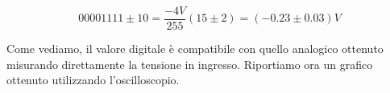 $$00001111\pm10=\frac{-4 V}{255}(15\pm2)=(-0.23\pm0.03)V$$

Come vediamo, il valore digitale è compatibile con quello analogico ottenuto misurando direttamente la tensione in ingresso. Riportiamo ora un grafico ottenuto utilizzando l'oscilloscopio. 


